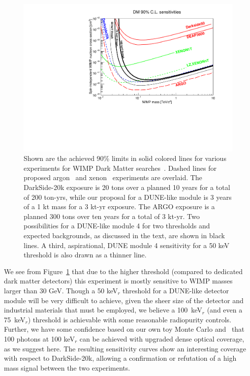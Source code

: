 \documentclass[a4paper,11pt]{article}
\begin{document}
\begin{figure}[t]
\begin{centering}
\includegraphics[width=0.90\columnwidth]{Figures/sens90_100-10-bkd_50pcteff_11June2020.pdf}
\par\end{centering}

\caption{Shown are the achieved 90\% limits in solid colored lines for various experiments for WIMP Dark Matter
searches~\cite{DEAP-PRD,DarkSide-50,xenon1t}. Dashed lines for proposed argon~\cite{DarkSide-20k} and xenon~\cite{LZ, darwin} experiments are overlaid. The DarkSide-20k exposure is 20 tons over a planned 10 years for a total of 200 ton-yrs, while our proposal for a DUNE-like module is 3 years of a 1 kt mass for a 3 kt-yr exposure. The ARGO exposure is a planned 300 tons over ten years for a total of 3 kt-yr. Two possibilities for a DUNE-like module 4 for two thresholds and expected backgrounds, as discussed in the text, are shown in black lines. A third, aspirational, DUNE module 4 sensitivity for  a 50 keV threshold  is also drawn as a thinner line.   \label{fig:Sensitivity}}
\end{figure}

We see from Figure~\ref{fig:Sensitivity} that due to the higher threshold (compared to dedicated dark matter detectors) this experiment is mostly sensitive to WIMP masses larger than 30 GeV. Though a 50 keV$_r$ threshold for a DUNE-like detector module will be very difficult to achieve, given the sheer size of the detector and industrial materials that must be employed, we believe a 100~keV$_r$ (and even a 75~keV$_r$) threshold is achievable with some reasonable radiopurity controls. Further, we have some confidence based on our own toy Monte Carlo and~\cite{privateconv:flavio} that 100 photons at 100 keV$_r$ can be achieved with upgraded dense optical coverage, as we suggest here. The resulting sensitivity curves show an interesting coverage with respect to DarkSide-20k, allowing a confirmation or refutation of a high mass signal between the two experiments. %
\end{document}
